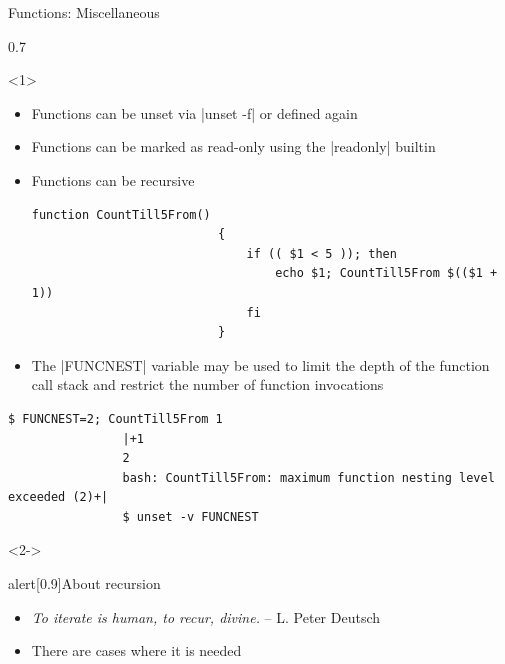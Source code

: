 \begin{frame}[fragile]{Functions: Miscellaneous}
    \begin{overlayarea}{\textwidth}{0.7\textheight}
        \begin{onlyenv}<1>
            \begin{itemize}
                \item Functions can be unset via \;\bash|unset -f|\; or defined again
                \item Functions can be marked as read-only using the \;\bash|readonly|\; builtin
                \item Functions can be recursive
                      \begin{lstlisting}[style=MyBash, xrightmargin=12mm, aboveskip=2mm, belowskip=-6mm]
                          function CountTill5From()
                          {
                              if (( $1 < 5 )); then
                                  echo $1; CountTill5From $(($1 + 1))
                              fi
                          }
                      \end{lstlisting}
                \item The \bash|FUNCNEST| variable may be used to limit the depth of the function call stack and restrict the number of function invocations
            \end{itemize}
            \begin{lstlisting}[style=MyBash, xrightmargin=-2mm, xleftmargin=2mm, numbers=none]
                $ FUNCNEST=2; CountTill5From 1
                |+1
                2
                bash: CountTill5From: maximum function nesting level exceeded (2)+|
                $ unset -v FUNCNEST
            \end{lstlisting}
        \end{onlyenv}
        \begin{onlyenv}<2->
            \vspace{-5mm}
            \begin{varblock}{alert}[0.9\textwidth]{About recursion}
                \begin{itemize}
                    \item \emph{\guillemotleft To iterate is human, to recur, divine.\guillemotright} -- L. Peter Deutsch
                    \item There are cases where it is needed

\end{itemize}
\end{varblock}
\end{onlyenv}
\end{overlayarea}
\end{frame}
